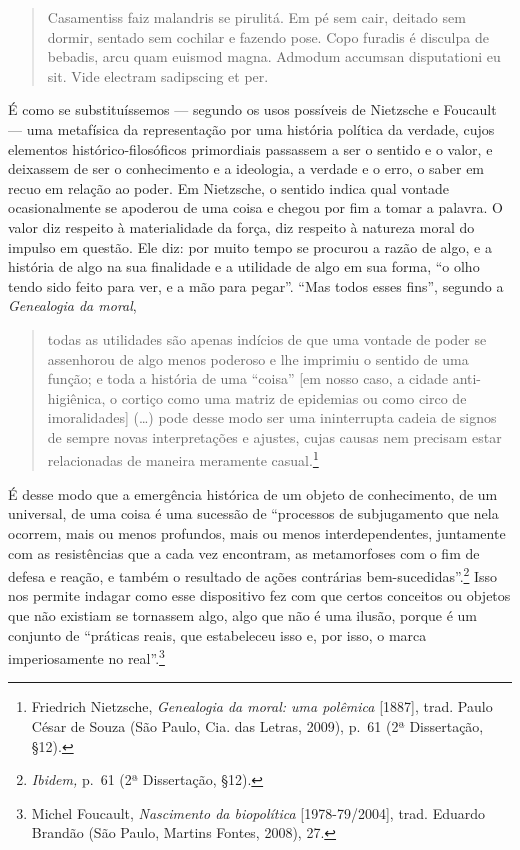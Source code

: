\begin{quote}
Casamentiss faiz malandris se pirulitá. Em pé sem cair, deitado sem
dormir, sentado sem cochilar e fazendo pose. Copo furadis é disculpa de
bebadis, arcu quam euismod magna. Admodum accumsan disputationi eu sit.
Vide electram sadipscing et per.
\end{quote}

É como se substituíssemos --- segundo os usos possíveis de Nietzsche e
Foucault --- uma metafísica da representação por uma história política da
verdade, cujos elementos histórico-filosóficos primordiais passassem a
ser o sentido e o valor, e deixassem de ser o conhecimento e a
ideologia, a verdade e o erro, o saber em recuo em relação ao poder. Em
Nietzsche, o sentido indica qual vontade ocasionalmente se apoderou de
uma coisa e chegou por fim a tomar a palavra. O valor diz respeito à
materialidade da força, diz respeito à natureza moral do impulso em
questão. Ele diz: por muito tempo se procurou a razão de algo, e a
história de algo na sua finalidade e a utilidade de algo em sua forma,
``o olho tendo sido feito para ver, e a mão para pegar''. ``Mas todos
esses fins'', segundo a \textit{Genealogia da moral},

\begin{quote}
todas as utilidades são apenas indícios de que uma vontade de poder se
assenhorou de algo menos poderoso e lhe imprimiu o sentido de uma
função; e toda a história de uma ``coisa'' {[}em nosso caso, a cidade
anti-higiênica, o cortiço como uma matriz de epidemias ou como circo de
imoralidades{]} (\ldots{}) pode desse modo ser uma ininterrupta cadeia
de signos de sempre novas interpretações e ajustes, cujas causas nem
precisam estar relacionadas de maneira meramente casual.\footnote{Friedrich
  Nietzsche, \textit{Genealogia da moral: uma polêmica} {[}1887{]}, trad.
  Paulo César de Souza (São Paulo, Cia. das Letras, 2009), p.~61 (2ª
  Dissertação, §12).}
\end{quote}

É desse modo que a emergência histórica de um objeto de conhecimento, de
um universal, de uma coisa é uma sucessão de ``processos de subjugamento
que nela ocorrem, mais ou menos profundos, mais ou menos
interdependentes, juntamente com as resistências que a cada vez
encontram, as metamorfoses com o fim de defesa e reação, e também o
resultado de ações contrárias bem-sucedidas''.\footnote{\textit{Ibidem,}
  p.~61 (2ª Dissertação, §12).} Isso nos permite indagar como esse
dispositivo fez com que certos conceitos ou objetos que não existiam se
tornassem algo, algo que não é uma ilusão, porque é um conjunto de
``práticas reais, que estabeleceu isso e, por isso, o marca
imperiosamente no real''.\footnote{Michel Foucault, \textit{Nascimento da
  biopolítica} {[}1978-79/2004{]}, trad. Eduardo Brandão (São Paulo,
  Martins Fontes, 2008), 27.}

